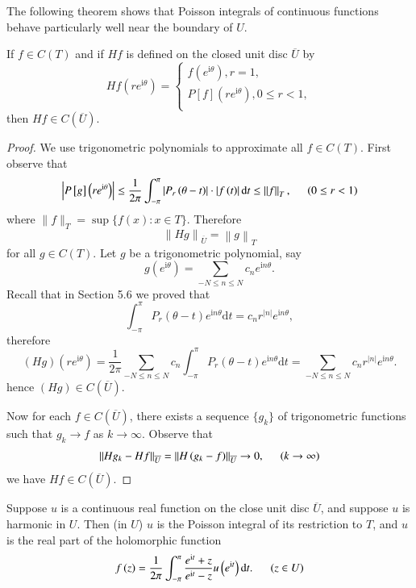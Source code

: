 The following theorem shows that Poisson integrals of continuous functions behave particularly well near the boundary of $U$.
\begin{theorem}
If $f\in C(T)$ and if $Hf$ is defined on the closed unit disc $\overline{U}$ by 
$$
Hf\left( re^{\mathrm{i}\theta} \right) =\begin{cases}
	f\left( e^{\mathrm{i}\theta} \right) ,r=1,\\
	P\left[ f \right] \left( re^{\mathrm{i}\theta} \right) ,0\le r<1,\\
\end{cases}
$$
then $Hf\in C(\overline{U})$.
\end{theorem}
\begin{proof}
We use trigonometric polynomials to approximate all $f\in C(T)$. First observe that 
$$
\left| P\left[ g \right] \left( re^{\mathrm{i}\theta} \right) \right|\le \frac{1}{2\pi}\int_{-\pi}^{\pi}{\left| P_r\left( \theta -t \right) \right|\cdot \left| f\left( t \right) \right|\mathrm{d}t}\le \left\| f \right\| _T,\hspace{0.5cm}\left( 0\le r<1 \right) 
$$
where $\|f\|_T=\sup\{f(x):x\in T\}$. Therefore 
$$
\left\| Hg \right\| _{\overline{U}}=\left\| g \right\| _T
$$
for all $g\in C(T)$. Let $g$ be a trigonometric polynomial, say 
$$
g\left( e^{\mathrm{i}\theta} \right) =\sum_{-N\le n\le N}{c_ne^{\mathrm{i}n\theta}}.
$$
Recall that in Section 5.6 we proved that 
$$
\int_{-\pi}^{\pi}{P_r\left( \theta -t \right) e^{\mathrm{i}n\theta}\mathrm{d}t}=c_nr^{\left| n \right|}e^{\mathrm{i}n\theta},
$$
therefore 
$$
\left( Hg \right) \left( re^{\mathrm{i}\theta} \right) =\frac{1}{2\pi}\sum_{-N\le n\le N}{c_n\int_{-\pi}^{\pi}{P_r\left( \theta -t \right) e^{\mathrm{i}n\theta}\mathrm{d}t}}=\sum_{-N\le n\le N}{c_nr^{\left| n \right|}e^{\mathrm{i}n\theta}}.
$$
hence $(Hg)\in C(\overline{U})$.\par
Now for each $f\in C(\overline{U})$, there exists a sequence $\{g_k\}$ of trigonometric functions such that $g_k\to f$ as $k\to\infty$. Observe that 
$$
\left\| Hg_k-Hf \right\| _{\overline{U}}=\left\| H\left( g_k-f \right) \right\| _{\overline{U}}\rightarrow 0,\hspace{0.5cm}\left( k\rightarrow \infty \right) 
$$
we have $Hf\in C(\overline{U})$.
\end{proof}
\begin{theorem}
Suppose $u$ is a continuous real function on the close unit disc $\overline{U}$, and suppose $u$ is harmonic in $U$. Then (in $U$) $u$ is the Poisson integral of its restriction to $T$, and $u$ is the real part of the holomorphic function 
$$
f\left( z \right) =\frac{1}{2\pi}\int_{-\pi}^{\pi}{\frac{e^{\mathrm{i}t}+z}{e^{\mathrm{i}t}-z}u\left( e^{\mathrm{i}t} \right) \mathrm{d}t}.\hspace{0.5cm}\left( z\in U \right) 
$$
\end{theorem}
